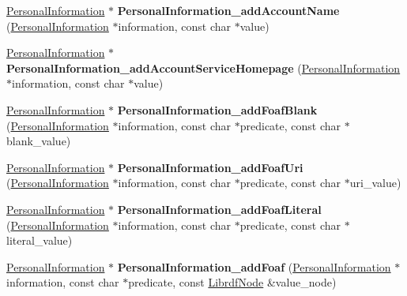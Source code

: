 \begin{DoxyCompactItemize}
\item 
\mbox{\label{namespaceomexmeta_a75306b1329c755b124ad9b40f147abdc}} 
\hyperlink{classomexmeta_1_1PersonalInformation}{Personal\+Information} $\ast$ {\bfseries Personal\+Information\+\_\+add\+Account\+Name} (\hyperlink{classomexmeta_1_1PersonalInformation}{Personal\+Information} $\ast$information, const char $\ast$value)
\item 
\mbox{\label{namespaceomexmeta_ad597791b54c6f08a3572033aab6487dd}} 
\hyperlink{classomexmeta_1_1PersonalInformation}{Personal\+Information} $\ast$ {\bfseries Personal\+Information\+\_\+add\+Account\+Service\+Homepage} (\hyperlink{classomexmeta_1_1PersonalInformation}{Personal\+Information} $\ast$information, const char $\ast$value)
\item 
\mbox{\label{namespaceomexmeta_ac131d8bd8df53e89fa1256a0be45358d}} 
\hyperlink{classomexmeta_1_1PersonalInformation}{Personal\+Information} $\ast$ {\bfseries Personal\+Information\+\_\+add\+Foaf\+Blank} (\hyperlink{classomexmeta_1_1PersonalInformation}{Personal\+Information} $\ast$information, const char $\ast$predicate, const char $\ast$blank\+\_\+value)
\item 
\mbox{\label{namespaceomexmeta_a31ecc9357011658fa6785451886a0b64}} 
\hyperlink{classomexmeta_1_1PersonalInformation}{Personal\+Information} $\ast$ {\bfseries Personal\+Information\+\_\+add\+Foaf\+Uri} (\hyperlink{classomexmeta_1_1PersonalInformation}{Personal\+Information} $\ast$information, const char $\ast$predicate, const char $\ast$uri\+\_\+value)
\item 
\mbox{\label{namespaceomexmeta_a692328b7caa5527bf1f5ff86e7077637}} 
\hyperlink{classomexmeta_1_1PersonalInformation}{Personal\+Information} $\ast$ {\bfseries Personal\+Information\+\_\+add\+Foaf\+Literal} (\hyperlink{classomexmeta_1_1PersonalInformation}{Personal\+Information} $\ast$information, const char $\ast$predicate, const char $\ast$literal\+\_\+value)
\item 
\mbox{\label{namespaceomexmeta_a6edcf0c8af06246bb3344ff3f4ea7a21}} 
\hyperlink{classomexmeta_1_1PersonalInformation}{Personal\+Information} $\ast$ {\bfseries Personal\+Information\+\_\+add\+Foaf} (\hyperlink{classomexmeta_1_1PersonalInformation}{Personal\+Information} $\ast$information, const char $\ast$predicate, const \hyperlink{classredland_1_1LibrdfNode}{Librdf\+Node} \&value\+\_\+node)

\end{DoxyCompactItemize}
